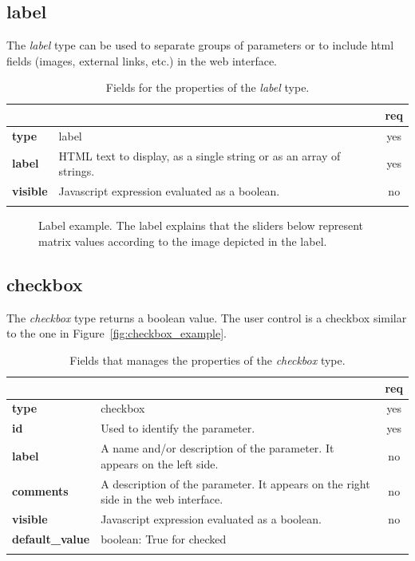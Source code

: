 \subsection{label}

The \emph{label} type can be used to separate groups of parameters or to include html fields (images, external links, etc.) in the web interface.

\begin{longtable}{|>{\bf}L{\linewidth}|L{\linewidth}|c|}
\hline
      &  & {\bf req} 
\tabularnewline \hline \hline
 type  & label       & yes \\ \hline
 label & HTML text to display, as a single string or as an array of strings. & yes \\ \hline
 visible    & Javascript expression evaluated as a boolean.
            & no \\ \hline
\caption{Fields for the properties of the \emph{label} type.}
\end{longtable}

\begin{figure}[h]
\centering
{}
\caption{Label example. The label explains that the sliders below represent matrix values according to the image depicted in the label.}
\label{fig:label_example}
\end{figure}

\subsection{checkbox}

The \emph{checkbox} type returns a boolean value. The user control is a checkbox similar to the one in Figure~\ref{fig:checkbox_example}.

\begin{longtable}{|>{\bf}L{\linewidth}|L{\linewidth}|c|}
\hline
      &  & {\bf req} 
\tabularnewline \hline \hline
 type  & checkbox  & yes \\ \hline
 id     & Used to identify the parameter. & yes \\ \hline
 label  & A name and/or description of the parameter. It appears on the left side. & no
                      \\ \hline
 comments & A description of the parameter. It appears on the right side in the web interface. & no
                      \\ \hline
 visible    & Javascript expression evaluated as a boolean. & no \\ \hline
 default\_value & boolean: True for checked & \\ \hline
\caption{Fields that manages the properties of the \emph{checkbox} type.}
\end{longtable}

